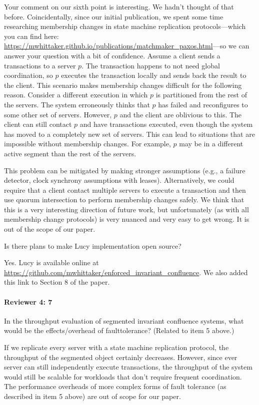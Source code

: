 \documentclass[9pt]{article}
\begin{document}
\begin{multicols*}{2}
Your comment on our sixth point is interesting. We hadn't thought of that
before. Coincidentally, since our initial publication, we spent some time
researching membership changes in state machine replication protocols---which
you can find here:
\url{https://mwhittaker.github.io/publications/matchmaker_paxos.html}---so we
can answer your question with a bit of confidence. Assume a client sends a
transactions to a server $p$. The transaction happens to not need global
coordination, so $p$ executes the transaction locally and sends back the result
to the client. This scenario makes membership changes difficult for the
following reason. Consider a different execution in which $p$ is partitioned
from the rest of the servers. The system erroneously thinks that $p$ has failed
and reconfigures to some other set of servers. However, $p$ and the client are
oblivious to this. The client can still contact $p$ and have transactions
executed, even though the system has moved to a completely new set of servers.
This can lead to situations that are impossible without membership changes. For
example, $p$ may be in a different active segment than the rest of the servers.

This problem can be mitigated by making stronger assumptions (e.g., a failure
detector, clock synchrony assumptions with leases). Alternatively, we could
require that a client contact multiple servers to execute a transaction and
then use quorum intersection to perform membership changes safely. We think
that this is a very interesting direction of future work, but unfortunately (as
with all membership change protocols) is very nuanced and very easy to get
wrong. It is out of the scope of our paper.

\begin{feedback}
  Is there plans to make Lucy implementation open source?
\end{feedback}
Yes. Lucy is available online at
\url{https://github.com/mwhittaker/enforced_invariant_confluence}. We also
added this link to Section 8 of the paper.

\paragraph{Reviewer 4: 7}
\begin{feedback}
  In the throughput evaluation of segmented invariant confluence systems, what
  would be the effects/overhead of faulttolerance? (Related to item 5 above.)
\end{feedback}
If we replicate every server with a state machine replication protocol, the
throughput of the segmented \invariantconfluent{} object certainly
decreases. However, since ever server can still independently execute
transactions, the throughput of the system would still be scalable for
workloads that don't require frequent coordination.
%
The performance overheads of more complex forms of fault tolerance (as
described in item 5 above) are out of scope for our paper.


\end{multicols*}
\end{document}
